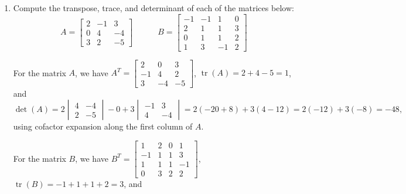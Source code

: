 \documentclass[12pt]{article}
\newcommand{\bbm}{\begin{bmatrix}}
\newcommand{\ebm}{\end{bmatrix}}
\newcommand{\bvm}{\begin{vmatrix}}
\newcommand{\evm}{\end{vmatrix}}
\begin{document}
\thispagestyle{fancy}
 \begin{enumerate}
\item Compute the transpose, trace, and determinant of each of the matrices below:
\[
 A = \bbm 2 & -1 & 3\\0&4&-4\\3&2&-5\ebm \quad \quad \quad B = \bbm -1&-1&1&0\\2&1&1&3\\0&1&1&2\\1&3&-1&2\ebm
\]

\bigskip

For the matrix $A$, we have $A^T = \bbm 2&0&3\\-1&4&2\\3&-4&-5\ebm$, $\operatorname{tr}(A) = 2+4-5=1$, and
\[
 \det(A) = 2\bvm 4&-4\\2&-5\evm - 0 + 3\bvm -1&3\\4&-4\evm = 2(-20+8)+3(4-12) = 2(-12)+3(-8)=-48,
\]
using cofactor expansion along the first column of $A$.

\medskip

For the matrix $B$, we have $B^T = \bbm 1&2&0&1\\-1&1&1&3\\1&1&1&-1\\0&3&2&2\ebm$, $\operatorname{tr}(B) = -1+1+1+2=3$, and


\end{enumerate}
\end{document}
